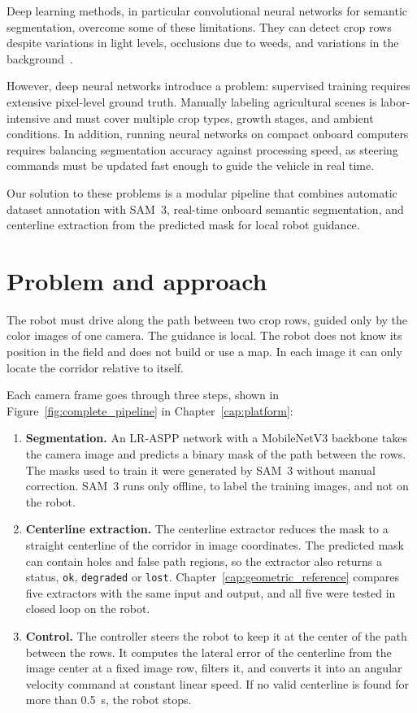 Deep learning methods, in particular convolutional neural networks for semantic segmentation, overcome some of these limitations. They can detect crop rows despite variations in light levels, occlusions due to weeds, and variations in the background~\cite{desilva2024rowdetection}.

However, deep neural networks introduce a problem: supervised training requires extensive pixel-level ground truth. Manually labeling agricultural scenes is labor-intensive and must cover multiple crop types, growth stages, and ambient conditions. In addition, running neural networks on compact onboard computers requires balancing segmentation accuracy against processing speed, as steering commands must be updated fast enough to guide the vehicle in real time.

Our solution to these problems is a modular pipeline that combines automatic dataset annotation with SAM~3, real-time onboard semantic segmentation, and centerline extraction from the predicted mask for local robot guidance.

\section{Problem and approach}
\label{sec:problem_approach}

The robot must drive along the path between two crop rows, guided only by the color images of one camera. The guidance is local. The robot does not know its position in the field and does not build or use a map. In each image it can only locate the corridor relative to itself.

Each camera frame goes through three steps, shown in Figure~\ref{fig:complete_pipeline} in Chapter~\ref{cap:platform}:
\begin{enumerate}
\item \textbf{Segmentation.} An LR-ASPP network with a MobileNetV3 backbone takes the camera image and predicts a binary mask of the path between the rows. The masks used to train it were generated by SAM~3 without manual correction. SAM~3 runs only offline, to label the training images, and not on the robot.
\item \textbf{Centerline extraction.} The centerline extractor reduces the mask to a straight centerline of the corridor in image coordinates. The predicted mask can contain holes and false path regions, so the extractor also returns a status, \texttt{ok}, \texttt{degraded} or \texttt{lost}. Chapter~\ref{cap:geometric_reference} compares five extractors with the same input and output, and all five were tested in closed loop on the robot.
\item \textbf{Control.} The controller steers the robot to keep it at the center of the path between the rows. It computes the lateral error of the centerline from the image center at a fixed image row, filters it, and converts it into an angular velocity command at constant linear speed. If no valid centerline is found for more than 0.5~s, the robot stops.
\end{enumerate}


